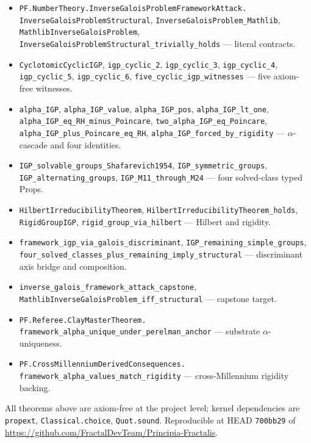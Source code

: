 \documentclass[11pt,a4paper]{article}
\theoremstyle{plain}
\theoremstyle{definition}
\begin{document}
\begin{itemize}[leftmargin=*,nosep]
\item \texttt{PF.NumberTheory.InverseGaloisProblemFrameworkAttack.\\
  InverseGaloisProblemStructural},
  \texttt{InverseGaloisProblem\_Mathlib},
  \texttt{MathlibInverseGaloisProblem},
  \texttt{InverseGaloisProblemStructural\_trivially\_holds}
  --- literal contracts.
\item \texttt{CyclotomicCyclicIGP}, \texttt{igp\_cyclic\_2},
  \texttt{igp\_cyclic\_3}, \texttt{igp\_cyclic\_4},
  \texttt{igp\_cyclic\_5}, \texttt{igp\_cyclic\_6},
  \texttt{five\_cyclic\_igp\_witnesses}
  --- five axiom-free witnesses.
\item \texttt{alpha\_IGP}, \texttt{alpha\_IGP\_value},
  \texttt{alpha\_IGP\_pos}, \texttt{alpha\_IGP\_lt\_one},
  \texttt{alpha\_IGP\_eq\_RH\_minus\_Poincare},
  \texttt{two\_alpha\_IGP\_eq\_Poincare},
  \texttt{alpha\_IGP\_plus\_Poincare\_eq\_RH},
  \texttt{alpha\_IGP\_forced\_by\_rigidity}
  --- $\alpha$-cascade and four identities.
\item \texttt{IGP\_solvable\_groups\_Shafarevich1954},
  \texttt{IGP\_symmetric\_groups},
  \texttt{IGP\_alternating\_groups},
  \texttt{IGP\_M11\_through\_M24} --- four solved-class typed Props.
\item \texttt{HilbertIrreducibilityTheorem},
  \texttt{HilbertIrreducibilityTheorem\_holds},
  \texttt{RigidGroupIGP},
  \texttt{rigid\_group\_via\_hilbert} --- Hilbert and rigidity.
\item \texttt{framework\_igp\_via\_galois\_discriminant},
  \texttt{IGP\_remaining\_simple\_groups},
  \texttt{four\_solved\_classes\_plus\_remaining\_imply\_structural}
  --- discriminant axis bridge and composition.
\item \texttt{inverse\_galois\_framework\_attack\_capstone},
  \texttt{MathlibInverseGaloisProblem\_iff\_structural}
  --- capstone target.
\item \texttt{PF.Referee.ClayMasterTheorem.\\
  framework\_alpha\_unique\_under\_perelman\_anchor}
  --- substrate $\alpha$-uniqueness.
\item \texttt{PF.CrossMillenniumDerivedConsequences.\\
  framework\_alpha\_values\_match\_rigidity}
  --- cross-Millennium rigidity backing.
\end{itemize}

All theorems above are axiom-free at the project level; kernel
dependencies are \texttt{propext}, \texttt{Classical.choice},
\texttt{Quot.sound}. Reproducible at HEAD \texttt{700bb29} of
\url{https://github.com/FractalDevTeam/Principia-Fractalis}.
\end{document}
